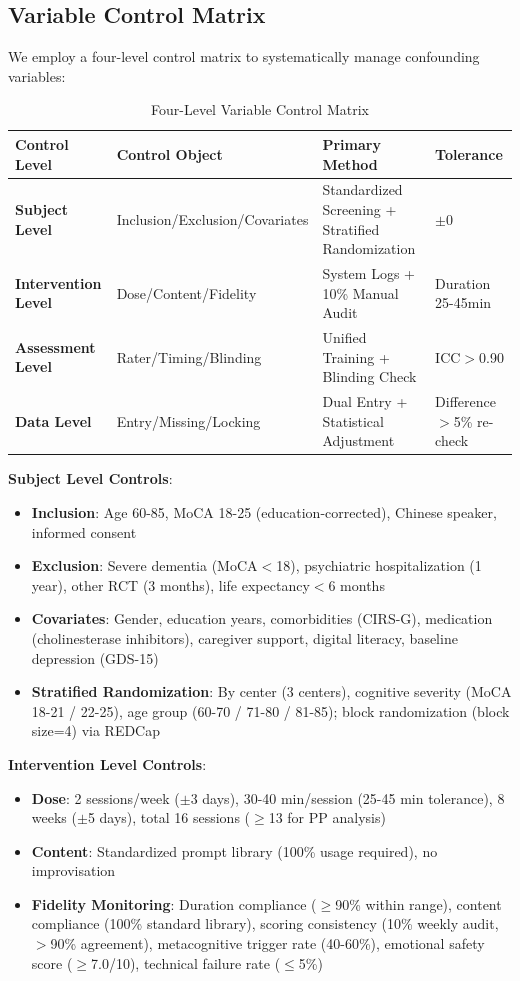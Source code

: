 \documentclass[11pt]{article}
\begin{document}
\subsection{Variable Control Matrix}

We employ a four-level control matrix to systematically manage confounding variables:

\begin{table}[h]
\centering
\caption{Four-Level Variable Control Matrix}
\label{tab:variable-control}
\begin{tabular}{llll}
\toprule
\textbf{Control Level} & \textbf{Control Object} & \textbf{Primary Method} & \textbf{Tolerance} \\
\midrule
\textbf{Subject Level} & Inclusion/Exclusion/Covariates & Standardized Screening + Stratified Randomization & $\pm$0 \\
\textbf{Intervention Level} & Dose/Content/Fidelity & System Logs + 10\% Manual Audit & Duration 25-45min \\
\textbf{Assessment Level} & Rater/Timing/Blinding & Unified Training + Blinding Check & ICC$>$0.90 \\
\textbf{Data Level} & Entry/Missing/Locking & Dual Entry + Statistical Adjustment & Difference$>$5\% re-check \\
\bottomrule
\end{tabular}
\end{table}

\textbf{Subject Level Controls}:
\begin{itemize}
    \item \textbf{Inclusion}: Age 60-85, MoCA 18-25 (education-corrected), Chinese speaker, informed consent
    \item \textbf{Exclusion}: Severe dementia (MoCA$<$18), psychiatric hospitalization (1 year), other RCT (3 months), life expectancy$<$6 months
    \item \textbf{Covariates}: Gender, education years, comorbidities (CIRS-G), medication (cholinesterase inhibitors), caregiver support, digital literacy, baseline depression (GDS-15)
    \item \textbf{Stratified Randomization}: By center (3 centers), cognitive severity (MoCA 18-21 / 22-25), age group (60-70 / 71-80 / 81-85); block randomization (block size=4) via REDCap
\end{itemize}

\textbf{Intervention Level Controls}:
\begin{itemize}
    \item \textbf{Dose}: 2 sessions/week ($\pm$3 days), 30-40 min/session (25-45 min tolerance), 8 weeks ($\pm$5 days), total 16 sessions ($\ge$13 for PP analysis)
    \item \textbf{Content}: Standardized prompt library (100\% usage required), no improvisation
    \item \textbf{Fidelity Monitoring}: Duration compliance ($\ge$90\% within range), content compliance (100\% standard library), scoring consistency (10\% weekly audit, $>$90\% agreement), metacognitive trigger rate (40-60\%), emotional safety score ($\ge$7.0/10), technical failure rate ($\le$5\%)
\end{itemize}
\end{document}

